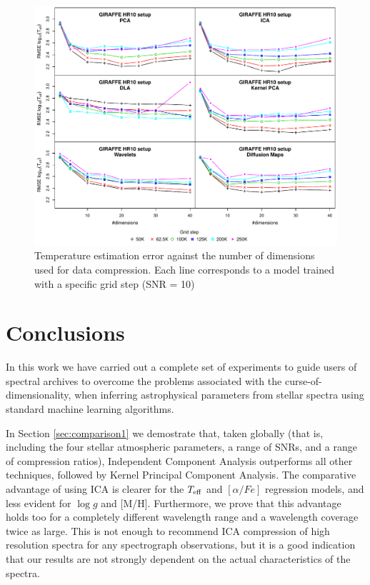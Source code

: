 \documentclass[a4paper,fleqn,usenatbib]{mnras}
\begin{document}
{{{\begin{figure}
\centering\includegraphics[width=\textwidth]{bestSVM_Teff_N-RMSE_HR10_snr=10_all.pdf}
\caption{Temperature estimation error against the number of dimensions
  used for data compression. Each line corresponds to a model trained
  with a specific grid step (SNR = 10)}
\label{fig:grid10}
\end{figure}

\section{Conclusions}
\label{sec:conclusions}

In this work we have carried out a complete set of experiments to 
guide users of spectral archives to overcome the problems associated 
with the curse-of-dimensionality, when inferring 
astrophysical parameters from stellar spectra using standard machine 
learning algorithms. 

In Section \ref{sec:comparison1} we demostrate that, taken globally 
(that is, including the four stellar atmospheric parameters, a 
range of SNRs, and a range of compression ratios),
Independent Component Analysis outperforms all other techniques, followed  
by Kernel Principal Component Analysis. The comparative advantage of 
using ICA is clearer for the $T_{\rm eff}$ and $\left[ \alpha/Fe \right]$ 
regression models, and less evident for $\log g$ and [M/H]. Furthermore, 
we prove that this advantage holds too for a completely different wavelength range 
and a wavelength coverage twice as large. This is not enough to recommend 
ICA compression of high resolution spectra for any spectrograph observations, but it 
is a good indication that our results are not strongly dependent on the 
actual characteristics of the spectra. 

}}}
\end{document}
